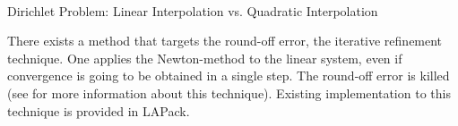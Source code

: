 \documentclass[a4paper,12pt]{article}
\makeatletter
\newenvironment{figurehere}
  {\def\@captype{figure}}
  {}
\makeatother
\begin{document}
\begin{center}
\begin{figurehere}
\\
\caption{Dirichlet Problem: Linear Interpolation vs. Quadratic Interpolation}\label{fig:dirichinter}
\end{figurehere}
\end{center}
There exists a method that targets the round-off error, the iterative refinement technique. One applies the Newton-method to the linear system, even if convergence is going to be obtained in a single step. The round-off error is killed (see \cite{Demmel} for more information about this technique). Existing implementation to this technique is provided in LAPack.
\end{document}
